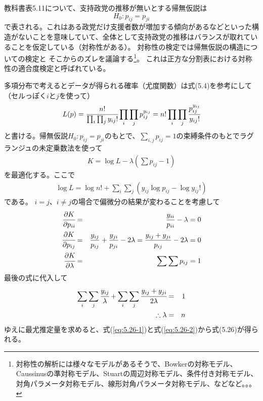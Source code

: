 \documentclass[10pt, a4paper]{ltjsarticle}
\newcommand\refeq[1]{式(\ref{#1})}
\begin{document}
教科書表5.11について、支持政党の推移が無いとする帰無仮説は
\begin{equation}
  H_0 : p_{ij} = p_{ji}
\end{equation}
で表される。これはある政党だけ支援者数が増加する傾向があるなどといった構造がないことを意味していて、全体として支持政党の推移はバランスが取れていることを仮定している（対称性がある）。
対称性の検定では帰無仮説の構造についての検定と
そこからのズレを議論する\footnote{対称性の解析には様々なモデルがあるそうで、Bowkerの対称モデル、Caussinusの準対称モデル、Stuartの周辺対称モデル、条件付き対称モデル、対角パラメータ対称モデル、線形対角パラメータ対称モデル、などなど。。。}。
これは正方な分割表における対称性の適合度検定と呼ばれている。

多項分布で考えるとデータが得られる確率（尤度関数）は式(5.4)を参考にして（セルっぽく$i$と$j$を使って）
\begin{equation}
  L(p) = \cfrac{n!}{\prod_i\prod_j y_{ij}!} \prod_i\prod_j p_{ij}^{y_{ij}} = n!\prod_i\prod_j \cfrac{p_{ij}^{y_{ij}}}{y_{ij}!}
\end{equation}
と書ける。帰無仮説$H_0:p_{ij}=p_{ji}$のもとで、$\sum_{i,j}p_{ij}=1$の束縛条件のもとでラグランジュの未定乗数法を使って
\begin{eqnarray}
  K = \log L -\lambda \left(\sum p_{ij}-1 \right)
\end{eqnarray}
を最適化する。ここで
\begin{eqnarray}
  \log L = \log n! + \sum_i\sum_j\left(y_{ij}\log p_{ij} - \log y_{ij}! \right) 
\end{eqnarray}
である。
$i=j$、$i\neq j$の場合で偏微分の結果が変わることを考慮して
\begin{eqnarray}
  \cfrac{\partial K}{\partial p_{ii}} &=& \frac{y_{ii}}{p_{ii}} - \lambda = 0 \label{eq:5.26-1}\\
  \cfrac{\partial K}{\partial p_{ij}} &=& \frac{y_{ij}}{p_{ij}} + \frac{y_{ji}}{p_{ji}} - 2\lambda = \frac{y_{ij}+y_{ji}}{p_{ij}} - 2\lambda = 0 \label{eq:5.26-2}\\
  \cfrac{\partial K}{\partial \lambda} &=& \sum\sum p_{ij} = 1
\end{eqnarray}
最後の式に代入して
\begin{eqnarray}
  \sum_i\sum_j \cfrac{y_{ij}}{\lambda} + \sum_i\sum_j \cfrac{y_{ij}+y_{ji}}{2\lambda} &=& 1 \\
  \therefore \lambda &=& n  
\end{eqnarray}
ゆえに最尤推定量を求めると、\refeq{eq:5.26-1}と\refeq{eq:5.26-2}から式(5.26)が得られる。
\end{document}
